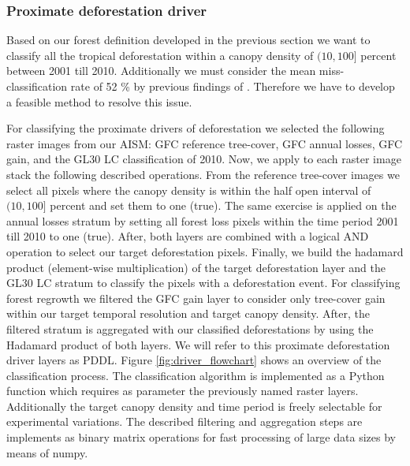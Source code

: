 		\subsubsection{Proximate deforestation driver}
			Based on our forest definition developed in the previous section we want to classify all the tropical deforestation within a canopy density of $(10,100]$ percent between 2001 till 2010. Additionally we must consider the mean miss-classification rate of 52 \% by previous findings of \citeauthor{Seydewitz2017} \citep{Seydewitz2017}. Therefore we have to develop a feasible method to resolve this issue.

			For classifying the proximate drivers of deforestation we selected the following raster images from our \ac{AISM}: \ac{GFC} reference tree-cover, \ac{GFC} annual losses, \ac{GFC} gain, and the \ac{GL30} \ac{LC} classification of 2010. Now, we apply to each raster image stack the following described operations. From the reference tree-cover images we select all pixels where the canopy density is within the half open interval of $(10,100]$ percent and set them to one (true). The same exercise is applied on the annual losses stratum by setting all forest loss pixels within the time period 2001 till 2010 to one (true). After, both layers are combined with a logical AND operation to select our target deforestation pixels. Finally, we build the hadamard product (element-wise multiplication) of the target deforestation layer and the \ac{GL30} \ac{LC} stratum to classify the pixels with a deforestation event. For classifying forest regrowth we filtered the \ac{GFC} gain layer to consider only tree-cover gain within our target temporal resolution and target canopy density. After, the filtered stratum is aggregated with our classified deforestations by using the Hadamard product of both layers. We will refer to this proximate deforestation driver layers as PDDL. Figure \ref{fig:driver_flowchart} shows an overview of the classification process. The classification algorithm is implemented as a Python function which requires as parameter the previously named raster layers. Additionally the target canopy density and time period is freely selectable for experimental variations. The described filtering and aggregation steps are implements as binary matrix operations for fast processing of large data sizes by means of numpy.
